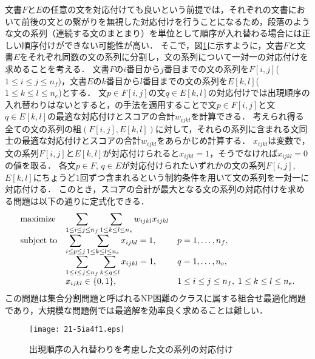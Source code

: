 \documentclass[japanese]{jnlp_1.4}
\begin{document}
文書$F$と$E$の任意の文を対応付けても良いという前提では，それぞれの文書において前後の文との繋がりを無視した対応付けを行うことになるため，段落のような文の系列（連続する文のまとまり）を単位として順序が入れ替わる場合には正しい順序付けができない可能性が高い．
そこで，図\ref{fig:alignment}に示すように，文書$F$と文書$E$をそれぞれ同数の文の系列に分割し，文の系列について一対一の対応付けを求めることを考える．
文書$F$の$i$番目から$j$番目までの文の系列を$F[i,j]$($1 \le i \le j \le n_f$)，文書$E$の$k$番目から$l$番目までの文の系列を$E[k,l]$($1 \le k \le l \le n_e$)とする．
文$p \in F[i,j]$の文$q \in E[k,l]$の対応付けでは出現順序の入れ替わりはないとすると，\cite{MooreRC2002}の手法を適用することで文$p \in F[i,j]$と文$q \in E[k,l]$の最適な対応付けとスコアの合計$w_{ijkl}$を計算できる．
考えられ得る全ての文の系列の組$(F[i,j],E[k,l])$に対して，それらの系列に含まれる文同士の最適な対応付けとスコアの合計$w_{ijkl}$をあらかじめ計算する．
$x_{ijkl}$は変数で，文の系列$F[i,j]$と$E[k,l]$が対応付けられると$x_{ijkl}=1$，そうでなければ$x_{ijkl}=0$の値を取る．
各文$p \in F$, $q \in E$が対応付けられたいずれかの文の系列$F[i,j]$, $E[k,l]$にちょうど1回ずつ含まれるという制約条件を用いて文の系列を一対一に対応付ける．
このとき，スコアの合計が最大となる文の系列の対応付けを求める問題は以下の通りに定式化できる．
\begin{equation}
\begin{array}{lll}
\textnormal{maximize} & \displaystyle\sum_{1 \le i \le j \le n_f} \sum_{1 \le k \le l \le n_e} w_{ijkl} x_{ijkl} & \\
\textnormal{subject to} & \displaystyle\sum_{i \le p \le j} \sum_{1 \le k \le l \le n_e} x_{ijkl} = 1, & p = 1,\dots,n_f,\\
& \displaystyle\sum_{1 \le i \le j \le n_f} \sum_{k \le q \le l} x_{ijkl} = 1, & q = 1,\dots,n_e,\\
& x_{ijkl} \in \{ 0, 1 \}, & 1 \le i \le j \le n_f, \; 1 \le k \le l \le n_e.
\end{array}
\end{equation}
この問題は集合分割問題と呼ばれるNP困難のクラスに属する組合せ最適化問題であり，大規模な問題例では最適解を効率良く求めることは難しい．

\begin{figure}[t]
\begin{center}
\texttt{[image: 21-5ia4f1.eps]}
\end{center}
\caption{出現順序の入れ替わりを考慮した文の系列の対応付け}
\label{fig:alignment}
\vspace{-0.5\Cvs}
\end{figure}
\end{document}
